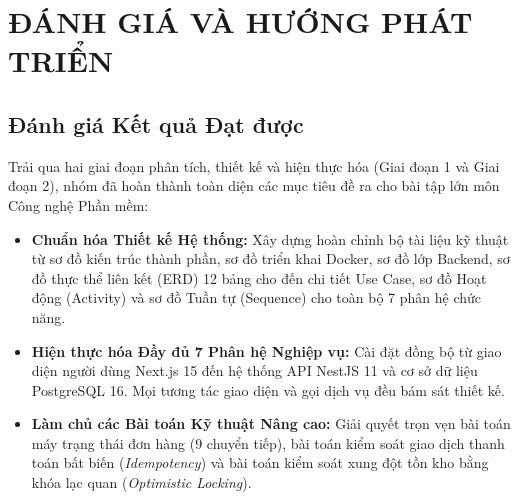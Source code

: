 \chapter{ĐÁNH GIÁ VÀ HƯỚNG PHÁT TRIỂN}

\section{Đánh giá Kết quả Đạt được}
Trải qua hai giai đoạn phân tích, thiết kế và hiện thực hóa (Giai đoạn 1 và Giai đoạn 2), nhóm đã hoàn thành toàn diện các mục tiêu đề ra cho bài tập lớn môn Công nghệ Phần mềm:
\begin{itemize}
    \item \textbf{Chuẩn hóa Thiết kế Hệ thống:} Xây dựng hoàn chỉnh bộ tài liệu kỹ thuật từ sơ đồ kiến trúc thành phần, sơ đồ triển khai Docker, sơ đồ lớp Backend, sơ đồ thực thể liên kết (ERD) 12 bảng cho đến chi tiết Use Case, sơ đồ Hoạt động (Activity) và sơ đồ Tuần tự (Sequence) cho toàn bộ 7 phân hệ chức năng.
    \item \textbf{Hiện thực hóa Đầy đủ 7 Phân hệ Nghiệp vụ:} Cài đặt đồng bộ từ giao diện người dùng Next.js 15 đến hệ thống API NestJS 11 và cơ sở dữ liệu PostgreSQL 16. Mọi tương tác giao diện và gọi dịch vụ đều bám sát thiết kế.
    \item \textbf{Làm chủ các Bài toán Kỹ thuật Nâng cao:} Giải quyết trọn vẹn bài toán máy trạng thái đơn hàng (9 chuyển tiếp), bài toán kiểm soát giao dịch thanh toán bất biến (\textit{Idempotency}) và bài toán kiểm soát xung đột tồn kho bằng khóa lạc quan (\textit{Optimistic Locking}).
\end{itemize}

